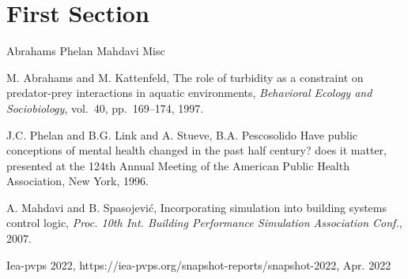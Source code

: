 \documentclass{article}
\begin{document}
\section{First Section}
\nocite{*}

Abrahams \cite{abrahams1997role} Phelan \cite{phelan1996have} Mahdavi \cite{mahdavi2007incorporating} Misc \cite{iea_2022}

\begin{thebibliography}{1}

 M. Abrahams and M. Kattenfeld, The role of turbidity as a constraint on predator-prey interactions in aquatic environments, {\em Behavioral Ecology and Sociobiology}, vol.~40, pp.~169--174, 1997. 

 J.C. Phelan and B.G. Link and A. Stueve, B.A. Pescosolido Have public conceptions of mental health changed in the past half century? does it matter, presented at the 124th Annual Meeting of the American Public Health Association, New York, 1996. 

 A. Mahdavi and B. Spasojevi{\'c}, Incorporating simulation into building systems control logic, {\em Proc. 10th Int. Building Performance Simulation Association Conf.}, 2007. 

  Iea-pvps 2022, https://iea-pvps.org/snapshot-reports/snapshot-2022, Apr. 2022 


\end{thebibliography}

% 






\end{document}
